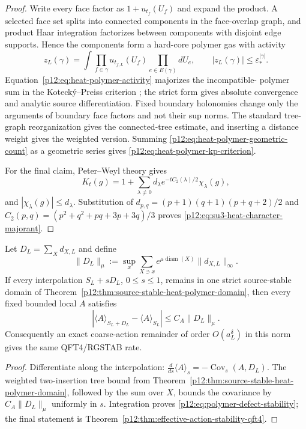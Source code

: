 \documentclass[12pt,a4paper]{article}
\begin{document}
\begin{proof}
Write every face factor as $1+u_{t_f}(U_f)$ and expand the product.  A selected
face set splits into connected components in the face-overlap graph, and
product Haar integration factorizes between components with disjoint edge
supports.  Hence the components form a hard-core polymer gas with activity
\[
 z_L(\gamma)=
 \int\prod_{f\in\gamma}u_{t_{f,L}}(U_f)
 \prod_{e\in E(\gamma)}dU_e,
 \qquad
 |z_L(\gamma)|\le\varepsilon_*^{|\gamma|}.
\]
Equation~\eqref{p12:eq:heat-polymer-activity} majorizes the incompatible-
polymer sum in the Koteck\'y--Preiss criterion
\cite{KoteckyPreiss1986}; the strict form gives absolute convergence and
analytic source differentiation.  Fixed boundary holonomies change only the
arguments of boundary face factors and not their sup norms.  The standard
tree-graph reorganization gives the connected-tree estimate, and inserting a
distance weight gives the weighted version.  Summing
\eqref{p12:eq:heat-polymer-geometric-count} as a geometric series gives
\eqref{p12:eq:heat-polymer-kp-criterion}.

For the final claim, Peter--Weyl theory gives
\[
 K_t(g)=1+\sum_{\lambda\ne0}d_\lambda
 e^{-tC_2(\lambda)/2}\chi_\lambda(g),
\]
and $|\chi_\lambda(g)|\le d_\lambda$.  Substitution of
$d_{p,q}=(p+1)(q+1)(p+q+2)/2$ and
$C_2(p,q)=(p^2+q^2+pq+3p+3q)/3$ proves
\eqref{p12:eq:su3-heat-character-majorant}.
\end{proof}

\begin{corollary}
\label{p12:cor:polymer-defect-stability}
Let $D_L=\sum_Xd_{X,L}$ and define
\[
 \|D_L\|_\mu
 :=\sup_x\sum_{X\ni x}
 e^{\mu\operatorname{diam}(X)}\|d_{X,L}\|_\infty.
\]
If every interpolation $S_L+sD_L$, $0\le s\le1$, remains in one strict
source-stable domain of Theorem~\ref{p12:thm:source-stable-heat-polymer-domain},
then every fixed bounded local $A$ satisfies
\begin{equation}
\label{p12:eq:polymer-defect-stability}
 |\langle A\rangle_{S_L+D_L}-\langle A\rangle_{S_L}|
 \le C_A\|D_L\|_\mu.
\end{equation}
Consequently an exact coarse-action remainder of order $O(a_L^\delta)$ in
this norm gives the same QFT4/RGSTAB rate.
\end{corollary}
\begin{proof}
Differentiate along the interpolation:
$\frac d{ds}\langle A\rangle_s=-\operatorname{Cov}_s(A,D_L)$.
The weighted two-insertion tree bound from
Theorem~\ref{p12:thm:source-stable-heat-polymer-domain}, followed by the sum
over $X$, bounds the covariance by $C_A\|D_L\|_\mu$ uniformly in $s$.
Integration proves \eqref{p12:eq:polymer-defect-stability}; the final statement
is Theorem~\ref{p12:thm:effective-action-stability-qft4}.
\end{proof}
\end{document}
